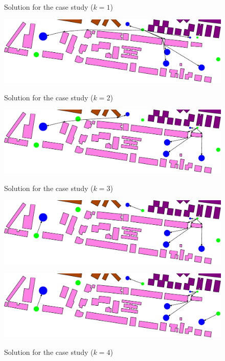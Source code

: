 \documentclass[a4paper,  review, authoryear, 1p.]{elsarticle}
\begin{document}
		
		\begin{figure}[H]
			\centering
			\caption{Solution for the case study ($k=1$)}
			\includegraphics[width=0.6\linewidth]{figures/solution1}
			\label{fig:solution1}
			\caption{Solution for the case study ($k=2$)}
			\includegraphics[width=0.6\linewidth]{figures/solution2}
			\label{fig:solution2}
			\caption{Solution for the case study ($k=3$)}
			\includegraphics[width=0.6\linewidth]{figures/solution3}
			\label{fig:solution3}
			\caption{Solution for the case study ($k=4$)}
			\includegraphics[width=0.6\linewidth]{figures/solution4}
			\label{fig:solution4}
		\end{figure}

		
		
\end{document}
